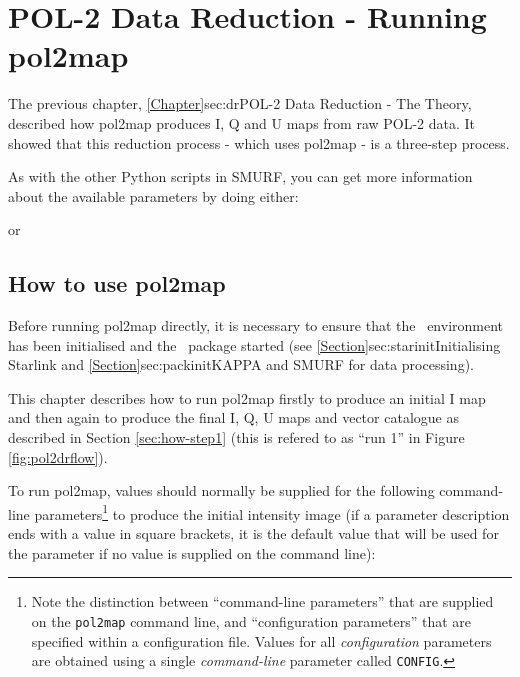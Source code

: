 \chapter{POL-2 Data Reduction - Running
  pol2map}
\label{sec:rundr}

The previous chapter, \cref{Chapter}{sec:dr}{POL-2 Data Reduction -
  The Theory}, described how pol2map produces I, Q and U maps from raw
POL-2 data.  It showed that this reduction process - which uses
pol2map - is a three-step process.

As with the other Python scripts in SMURF, you can get more
information about the available parameters by doing either:
\begin{terminalv}
\end{terminalv}
or
\begin{terminalv}
\end{terminalv}

\section{How to use pol2map}

Before running pol2map directly, it is necessary to ensure that
the \starlink\ environment has been initialised and the \smurf\
package started (see \cref{Section}{sec:starinit}{Initialising
  Starlink} and \cref{Section}{sec:packinit}{KAPPA and SMURF for data
  processing}).

This chapter describes how to run pol2map firstly to produce an
initial I map and then again to produce the final I, Q, U maps and
vector catalogue as described in Section \ref{sec:how-step1}
(this is refered to as ``run 1'' in Figure \ref{fig:pol2drflow}).

To run pol2map, values should normally be supplied for the following
command-line parameters\footnote{Note the distinction between
  ``command-line parameters'' that are supplied on the
  \texttt{pol2map} command line, and ``configuration parameters'' that
  are specified within a configuration file. Values for all
  \emph{configuration} parameters are obtained using a single
  \emph{command-line} parameter called \texttt{CONFIG}.} to produce
the initial intensity image (if a parameter description ends with a value
in square brackets, it is the default value that will be used for
the parameter if no value is supplied on the command line):

